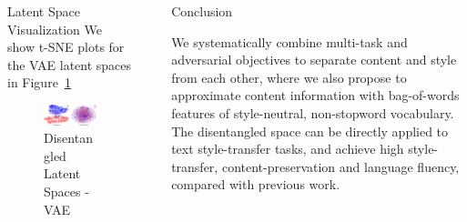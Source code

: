 \documentclass[final]{beamer}
\newlength{\sepwid}
\newlength{\onecolwid}
\newlength{\twocolwid}
\begin{document}
\begin{frame}[t]
\begin{columns}[t]
\begin{column}{\twocolwid}
\begin{columns}[t,totalwidth=\twocolwid]
\begin{column}{\onecolwid}
                    \begin{block}{Latent Space Visualization}
                        We show t-SNE plots for the VAE latent spaces in Figure~\ref{fig:tsne-plot}
                        \begin{figure}
                            \includegraphics[width=\linewidth]{vae-latent-spaces}
                            \caption{Disentangled Latent Spaces - VAE}
                            \label{fig:tsne-plot}
                        \end{figure}
                    \end{block}


                \end{column} %

            \end{columns} %

        \end{column} %

        \begin{column}{\sepwid}\end{column} %

        \begin{column}{\onecolwid} %


            \begin{block}{Conclusion}

                We systematically combine multi-task and adversarial objectives to separate content and style from each other, where we also propose to approximate content information with bag-of-words features of style-neutral, non-stopword vocabulary.
                The disentangled space can be directly applied to text style-transfer tasks, and achieve high style-transfer, content-preservation and language fluency, compared with previous work.


\end{block}
\end{column}
\end{columns}
\end{frame}
\end{document}
